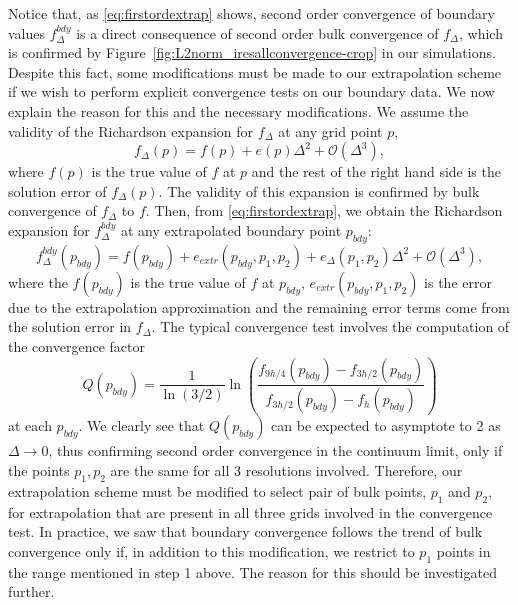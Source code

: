 \documentclass[a4paper,11pt]{article}
\numberwithin{equation}{section}
\begin{document}
Notice that, as \eqref{eq:firstordextrap} shows, second order convergence of boundary values $f^{bdy}_{\Delta}$ is a direct consequence of second order bulk convergence of $f_\Delta$, which is confirmed by Figure~\ref{fig:L2norm_iresallconvergence-crop} in our simulations. Despite this fact, some modifications must be made to our extrapolation scheme if we wish to perform explicit convergence tests on our boundary data. We now explain the reason for this and the necessary modifications. We assume the validity of the Richardson expansion \cite{doi:10.1098/rsta.1911.0009} for $f_{\Delta}$ at any grid point $p$,
\begin{equation}
\label{eq:Richexp}
f_\Delta(p)=f(p)+e(p)\Delta^2+\mathcal{O}(\Delta^3),
\end{equation}
where $f(p)$ is the true value of $f$ at $p$ and the rest of the right hand side is the solution error of $f_\Delta(p)$. The validity of this expansion is confirmed by bulk convergence of $f_\Delta$ to $f$.
Then, from \eqref{eq:firstordextrap}, we obtain the Richardson expansion for $f^{bdy}_{\Delta}$ at any extrapolated boundary point $p_{bdy}$:
 \begin{equation}
 \label{eq:bdyRichexp}
 f^{bdy}_{\Delta}(p_{bdy})=f(p_{bdy})+e_{extr}(p_{bdy},p_1,p_2)+e_\Delta(p_1,p_2)\Delta^2+\mathcal{O}(\Delta^3),
 \end{equation}
where the $f(p_{bdy})$ is the true value of $f$ at $p_{bdy}$, $e_{extr}(p_{bdy},p_1,p_2)$ is the error due to the extrapolation approximation and the remaining error terms come from the solution error in $f_\Delta$. The typical convergence test involves the computation of the convergence factor
\begin{equation}\label{eq:qconv}
Q(p_{bdy})=\frac{1}{\ln(3/2)}\ln\left( \frac{f_{9h/4}(p_{bdy})-f_{3h/2}(p_{bdy})}{f_{3h/2}(p_{bdy})-f_{h}(p_{bdy})} \right)
\end{equation}
at each $p_{bdy}$. We clearly see that $Q(p_{bdy})$ can be expected to asymptote to 2 as $\Delta\rightarrow0$, thus confirming second order convergence in the continuum limit, only if the points $p_1,p_2$ are the same for all 3 resolutions involved. Therefore, our extrapolation scheme must be modified to select pair of bulk points, $p_1$ and $p_2$, for extrapolation that are present in all three grids involved in the convergence test. 
In practice, we saw that boundary convergence follows the trend of bulk convergence only if, in addition to this modification, we restrict to $p_1$ points in the range mentioned in step 1 above. The reason for this should be investigated further. 
\end{document}
